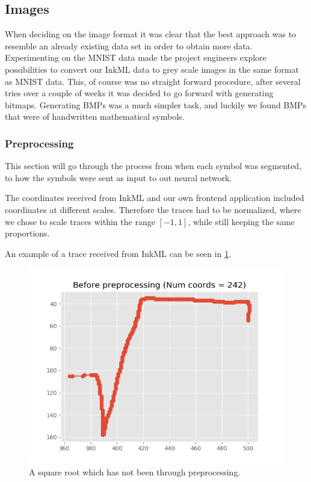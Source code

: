 \subsection{Images}
When deciding on the image format it was clear that the best approach was to resemble an already existing data set in order to obtain more data. Experimenting on the MNIST data made the project engineers explore possibilities to convert our InkML data to grey scale images in the same format as MNIST data. This, of course was no straight forward procedure, after several tries over a couple of weeks it was decided to go forward with generating bitmaps. Generating BMPs was a much simpler task, and luckily we found BMPs that were of handwritten mathematical symbols.

\subsubsection{Preprocessing}

This section will go through the process from when each symbol was segmented, to how the symbols were sent as input to out neural network.

The coordinates received from InkML and our own frontend application included coordinates at different scales. Therefore the traces had to be normalized, where we chose to scale traces within the range $[-1, 1]$, while still keeping the same proportions.

An example of a trace received from InkML can be seen in \ref{fig:sqrt_not_processed}.
\begin{figure}[H]
    \centering
    \includegraphics[width=\linewidth,keepaspectratio]{Assets/Chapter3_Method/sqrt_before_preprocessing.png}
    \caption{A square root which has not been through preprocessing.}
    \label{fig:sqrt_not_processed}
\end{figure}

